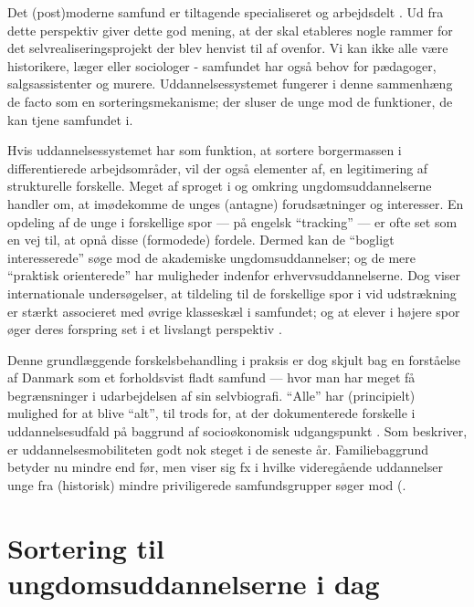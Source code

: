 Det (post)moderne samfund er tiltagende specialiseret og arbejdsdelt \autocite{baumanLiquidModernity2000}.
Ud fra dette perspektiv giver dette god mening, at der skal etableres nogle rammer for det selvrealiseringsprojekt der blev henvist til af \citeauthor{juulDiskurserOmUngdom2013} ovenfor.
Vi kan ikke alle være historikere, læger eller sociologer - samfundet har også behov for pædagoger, salgsassistenter og murere.
Uddannelsessystemet fungerer i denne sammenhæng de facto som en sorteringsmekanisme; der sluser de unge mod de funktioner, de kan tjene samfundet i.

Hvis uddannelsessystemet har som funktion, at sortere borgermassen i differentierede arbejdsområder, vil der også elementer af, en legitimering af strukturelle forskelle.
Meget af sproget i og omkring ungdomsuddannelserne handler om, at imødekomme de unges (antagne) forudsætninger og interesser.
En opdeling af de unge i forskellige spor — på engelsk “tracking” — er ofte set som en vej til, at opnå disse (formodede) fordele.
Dermed kan de “bogligt interesserede” søge mod de akademiske ungdomsuddannelser; og de mere “praktisk orienterede” har muligheder indenfor erhvervsuddannelserne.
Dog viser internationale undersøgelser, at tildeling til de forskellige spor i vid udstrækning er stærkt associeret med øvrige klasseskæl i samfundet; og at elever i højere spor øger deres forspring set i et livslangt perspektiv \autocite[s. 3]{gamoranTrackingInequalityNew2010}.

Denne grundlæggende forskelsbehandling i praksis er dog skjult bag en forståelse af Danmark som et forholdsvist fladt samfund — hvor man har meget få begrænsninger i udarbejdelsen af sin selvbiografi.
“Alle” har (principielt) mulighed for at blive “alt”, til trods for, at der dokumenterede forskelle i uddannelsesudfald på baggrund af socioøkonomisk udgangspunkt \autocite[se fx s 195ff i]{munkSocialUlighedOg2014}.
Som \citeauthor{munkSocialUlighedOg2014} beskriver, er uddannelsesmobiliteten godt nok steget i de seneste år.
Familiebaggrund betyder nu mindre end før, men viser sig fx i hvilke videregående uddannelser unge fra (historisk) mindre priviligerede samfundsgrupper søger mod (\citeyear[s. 199]{munkSocialUlighedOg2014}.

\section{Sortering til ungdomsuddannelserne i dag}\label{chap:sorting}

